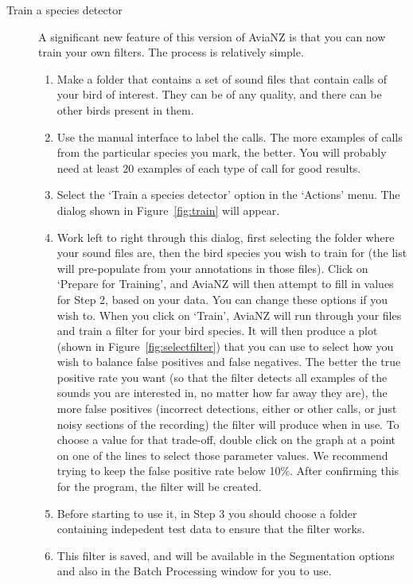 \documentclass{article}
\begin{document}
\begin{description}
\item [Train a species detector] A significant new feature of this version of AviaNZ is that you can now train your own filters. The process is relatively simple. 
    \begin{enumerate}
    \item Make a folder that contains a set of sound files that contain calls of your bird of interest. They can be of any quality, and there can be other birds present in them. 
    \item Use the manual interface to label the calls. The more examples of calls from the particular species you mark, the better. You will probably need at least 20 examples of each type of call for good results.
    \item Select the `Train a species detector' option in the `Actions' menu. The dialog shown in Figure~\ref{fig:train} will appear. 
    \item Work left to right through this dialog, first selecting the folder where your sound files are, then the bird species you wish to train for (the list will pre-populate from your annotations in those files). Click on `Prepare for Training', and AviaNZ will then attempt to fill in values for Step 2, based on your data. You can change these options if you wish to. When you click on `Train', AviaNZ will run through your files and train a filter for your bird species. It will then produce a plot (shown in Figure~\ref{fig:selectfilter}) that you can use to select how you wish to balance false positives and false negatives. The better the true positive rate you want (so that the filter detects all examples of the sounds you are interested in, no matter how far away they are), the more false positives (incorrect detections, either or other calls, or just noisy sections of the recording) the filter will produce when in use. 
    To choose a value for that trade-off, double click on the graph at a point on one of the lines to select those parameter values. We recommend trying to keep the false positive rate below 10\%. After confirming this for the program, the filter will be created.
    \item Before starting to use it, in Step 3 you should choose a folder containing indepedent test data to ensure that the filter works. 
    \item This filter is saved, and will be available in the Segmentation options and also in the Batch Processing window for you to use. %
    \end{enumerate}


\end{description}
\end{document}

